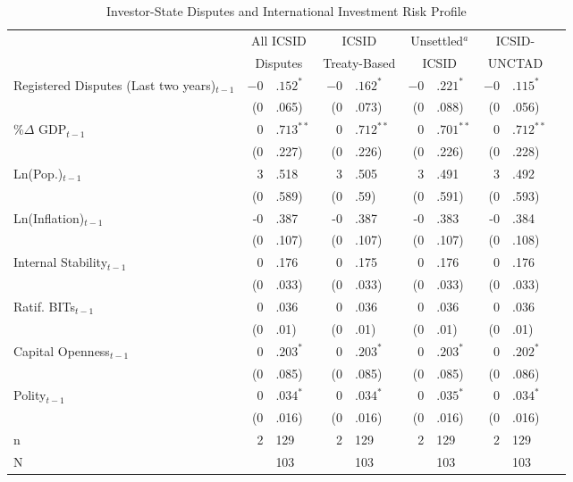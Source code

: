 \documentclass[12pt,onesided]{amsart}
\begin{document}
\begin{savenotes}
\begin{table}[ht]
\vspace{3cm}
\centering
\caption{Investor-State Disputes and International Investment Risk Profile}
\label{tab:dispRepLevel}
\begin{tabular}{lr@{} lr@{}lr@{}lr@{}lr@{}}
  \hline\hline
  & \multicolumn{2}{c}{All ICSID} & \multicolumn{2}{c}{ICSID} & \multicolumn{2}{c}{Unsettled$^{a}$} & \multicolumn{2}{c}{ICSID-} \\ 
  & \multicolumn{2}{c}{Disputes} & \multicolumn{2}{c}{Treaty-Based} & \multicolumn{2}{c}{ICSID} & \multicolumn{2}{c}{UNCTAD} \\
 \hline
Registered Disputes (Last two years)$_{t-1}$ & $-0$&$.152^{\ast}$ & $-0$&$.162^{\ast}$ & $-0$&$.221^{\ast}$ & $-0$&$.115^{\ast}$ \\ 
   & (0&.065) & (0&.073) & (0&.088) & (0&.056) \\ 
  \%$\Delta$ GDP$_{t-1}$ & $0$&$.713^{\ast\ast}$ & $0$&$.712^{\ast\ast}$ & $0$&$.701^{\ast\ast}$ & $0$&$.712^{\ast\ast}$ \\ 
   & (0&.227) & (0&.226) & (0&.226) & (0&.228) \\ 
  Ln(Pop.)$_{t-1}$ & 3&.518 & 3&.505 & 3&.491 & 3&.492 \\ 
   & (0&.589) & (0&.59) & (0&.591) & (0&.593) \\ 
  Ln(Inflation)$_{t-1}$ & -0&.387 & -0&.387 & -0&.383 & -0&.384 \\ 
   & (0&.107) & (0&.107) & (0&.107) & (0&.108) \\ 
  Internal Stability$_{t-1}$ & 0&.176 & 0&.175 & 0&.176 & 0&.176 \\ 
   & (0&.033) & (0&.033) & (0&.033) & (0&.033) \\ 
  Ratif. BITs$_{t-1}$ & 0&.036 & 0&.036 & 0&.036 & 0&.036 \\ 
   & (0&.01) & (0&.01) & (0&.01) & (0&.01) \\ 
  Capital Openness$_{t-1}$ & $0$&$.203^{\ast}$ & $0$&$.203^{\ast}$ & $0$&$.203^{\ast}$ & $0$&$.202^{\ast}$ \\ 
   & (0&.085) & (0&.085) & (0&.085) & (0&.086) \\ 
  Polity$_{t-1}$ & $0$&$.034^{\ast}$ & $0$&$.034^{\ast}$ & $0$&$.035^{\ast}$ & $0$&$.034^{\ast}$ \\ 
   & (0&.016) & (0&.016) & (0&.016) & (0&.016) \\ 
   \hline
  n & 2&129 & 2&129 & 2&129 & 2&129 \\ 
  N && 103 && 103 && 103 && 103 \\ 

\end{tabular}
\end{table}
\end{savenotes}
\end{document}
